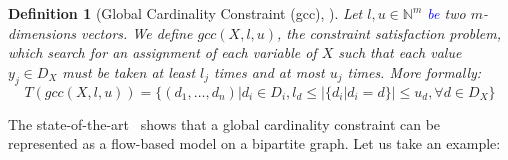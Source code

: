 \documentclass[jair,twoside,11pt,theapa]{article}
\newtheorem{definition}[theorem]{Definition}
\newcommand{\minor}[1]{\textcolor{blue}{#1}}
\newcommand{\N}{\mathbb{N}}
\newcommand{\Domain}{D}
\newcommand{\DX}{\Domain_{X}}
\newcommand{\domainof}[1]{\Domain_{#1}}
\newcommand{\nbVars}{n}
\newcommand{\setoftuples}[1]{T(#1)}
\newcommand{\low}{l}
\newcommand{\up}{u}
\newcommand{\gcc}[3]{gcc(#1,#2,#3)}
\begin{document}
\begin{definition}[Global Cardinality Constraint (gcc), \cite{Regin96}] 
Let $l, u \in \N^m$ \minor{be} two $m$-dimensions vectors.  We define $gcc(X,l,u)$, the constraint satisfaction problem, which search for an assignment of each variable of $X$ such that each value $y_j \in D_X$ must be taken at least $l_j$ times and at most $u_j$ times. More formally:
\begin{equation}
	\setoftuples{\gcc{X}{\low}{\up}} = \lbrace (d_1, \ldots, d_{\nbVars}) | d_i \in \domainof{i}, \low_d \leq |\lbrace d_i | d_i=d \rbrace | \leq \up_d, \forall d \in \DX \rbrace
\end{equation}
\end{definition}
The state-of-the-art~\cite{Regin96} shows that a global cardinality constraint can be represented as a flow-based model on a bipartite graph. Let us take an example:
\end{document}
